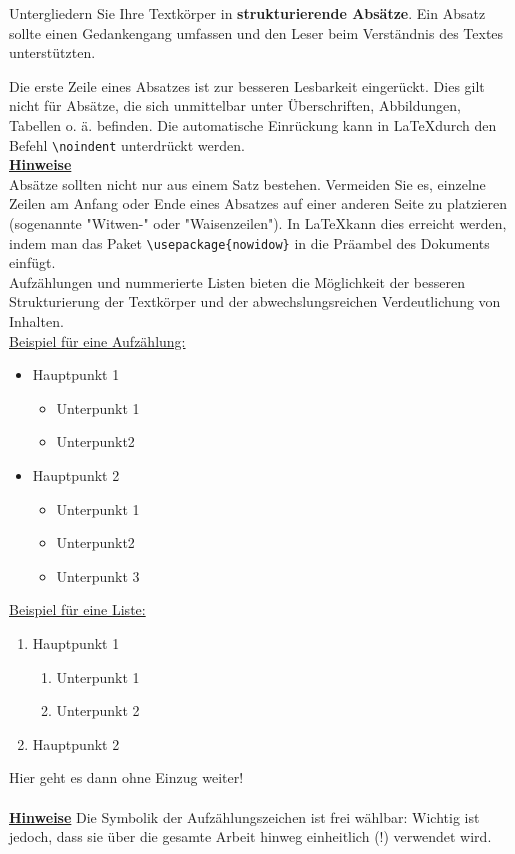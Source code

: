 \noindent
Untergliedern Sie Ihre Textkörper in \textbf{strukturierende Absätze}. Ein Absatz sollte einen Gedankengang umfassen und den Leser beim Verständnis des Textes unterstützten. 

Die erste Zeile eines Absatzes ist zur besseren Lesbarkeit eingerückt. Dies gilt nicht für Absätze, die sich unmittelbar unter Überschriften, Abbildungen, Tabellen o. ä. befinden. Die automatische Einrückung kann in \LaTeX durch den Befehl \verb!\noindent! unterdrückt werden.  \\

\noindent
\textbf{\uline{Hinweise}}\\
Absätze sollten nicht nur aus einem Satz bestehen. Vermeiden Sie es, einzelne Zeilen am Anfang oder Ende eines Absatzes auf einer anderen Seite zu platzieren (sogenannte "Witwen-" oder "Waisenzeilen"). In \LaTeX kann dies erreicht werden, indem man das Paket \verb!\usepackage{nowidow}! in die Präambel des Dokuments einfügt.\\

Aufzählungen und nummerierte Listen bieten die Möglichkeit der besseren Strukturierung der Textkörper und der abwechslungsreichen Verdeutlichung von Inhalten.\\  

\noindent
\uline{Beispiel für eine Aufzählung:} 
\begin{itemize}
    \item Hauptpunkt 1
    \begin{itemize}
        \item Unterpunkt 1
        \item Unterpunkt2
    \end{itemize}
    \item Hauptpunkt 2
    \begin{itemize}
        \item Unterpunkt 1
        \item Unterpunkt2
        \item Unterpunkt 3
    \end{itemize}
\end{itemize}

\noindent
\uline{Beispiel für eine Liste: }
\begin{enumerate}
    \item Hauptpunkt 1
    \begin{enumerate}
        \item Unterpunkt 1
        \item Unterpunkt 2
    \end{enumerate}
    \item Hauptpunkt 2
\end{enumerate}
Hier geht es dann ohne Einzug weiter!\\
\\
\textbf{\uline{Hinweise}}
Die Symbolik der Aufzählungszeichen ist frei wählbar: Wichtig ist jedoch, dass sie über die gesamte Arbeit hinweg einheitlich (!) verwendet wird. 


